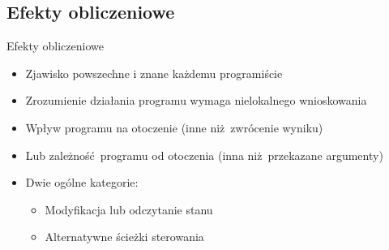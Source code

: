 \documentclass{beamer}
\begin{document}
\subsection{Efekty obliczeniowe}
\begin{frame}{Efekty obliczeniowe}
  \begin{itemize}
    \item Zjawisko powszechne i znane każdemu programiście
    \item Zrozumienie działania programu wymaga nielokalnego wnioskowania
    \item Wpływ programu na otoczenie (inne niż zwrócenie wyniku)
    \item Lub zależność programu od otoczenia (inna niż przekazane argumenty)
    \item Dwie ogólne kategorie:
    \begin{itemize}
      \item Modyfikacja lub odczytanie stanu 
      \item Alternatywne ścieżki sterowania 
    \end{itemize}
  \end{itemize}
\end{frame}
\end{document}
